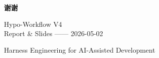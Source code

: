 \documentclass[theme=workflow,aspectratio=169,fontset=tech]{Hypo-Slide}
\begin{document}
\begin{frame}[plain]
  \centering
  \vspace{2cm}
  {\Huge\bfseries\color{WorkflowBlue}谢谢}
  \vspace{1cm}

  {\large Hypo-Workflow V4\\[0.3cm]
  Report \& Slides —— 2026-05-02}

  \vspace{0.5cm}
  {\small\color{WorkflowMuted}Harness Engineering for AI-Assisted Development}
\end{frame}
\end{document}

